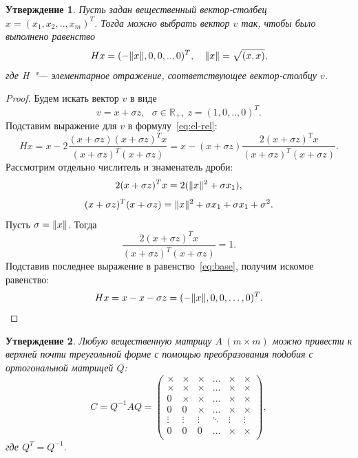 \documentclass[11pt,a4paper,twoside]{report}
\numberwithin{equation}{section}
\newtheorem*{statement}{Утверждение}
\theoremstyle{definition}
\theoremstyle{plain}
\DeclarePairedDelimiter\norm{\lVert}{\rVert}
\begin{document}
\begin{statement}
    Пусть задан вещественный вектор-столбец $x=(x_1, x_2, .. , x_m)^{T}$.
    Тогда можно выбрать вектор $v$ так, чтобы было выполнено равенство
    $$
        Hx=(-\norm{x},0,0,..,0)^{T}, ~~~\norm{x}=\sqrt{(x,x)},
    $$
    где H~"--- элементарное отражение, соответствующее вектор-столбцу $v$.
\end{statement}
%
%
\begin{proof}
    Будем искать вектор $v$ в виде
    $$
        v=x+\sigma z, ~~~\sigma \in \mathbb{R}_+,~z=(1,0,..,0)^{T}.
    $$
    Подставим выражение для $v$ в формулу~\eqref{eq:el-rel}:
    \begin{equation}
        \label{eq:base}
        Hx=x-2\frac{(x+\sigma z)(x+\sigma z)^{T}x}
        {(x+\sigma z)^{T}(x+\sigma z)}=
        x-(x+\sigma z)\frac{2(x+\sigma z)^{T}x}{(x+\sigma z)^{T}(x+\sigma z)}.
    \end{equation}
    Рассмотрим отдельно числитель и знаменатель дроби:
    $$
        2(x+\sigma z)^{T}x=2(\norm{x}^{2}+\sigma x_1),
    $$
    $$
        (x+\sigma z)^{T}(x+\sigma z)=\norm{x}^{2}+\sigma x_1+\sigma x_1
        +\sigma^{2}.
    $$
    Пусть $\sigma=\norm{x}$. Тогда
    $$
        \frac{2(x+\sigma z)^{T}x}{(x+\sigma z)^{T}(x+\sigma z)}=1.
    $$
    Подставив последнее выражение в равенство~\eqref{eq:base}, получим искомое
    равенство:
    $$
        Hx=x-x-\sigma z=(-\norm{x},0,0,\ldots,0)^{T}.
    $$
\end{proof}
%
%
\begin{statement}
Любую вещественную матрицу $A~(m \times m)$ можно привести к верхней почти
треугольной форме с помощью преобразования подобия с ортогональной матрицей $Q$:
%
$$
    C = Q^{-1}AQ =
    \begin{pmatrix}
        \times & \times & \times & \ldots & \times & \times\\
        \times & \times & \times & \ldots & \times & \times\\
        0      & \times & \times & \ldots & \times & \times\\
        0      &      0 & \times & \ldots & \times & \times\\
        \vdots & \vdots & \vdots & \ddots & \vdots & \vdots\\
        0      &      0 & 0      & \ldots & \times & \times\\
    \end{pmatrix},
$$
где $Q^T = Q^{-1}$.
%
\end{statement}
\end{document}
